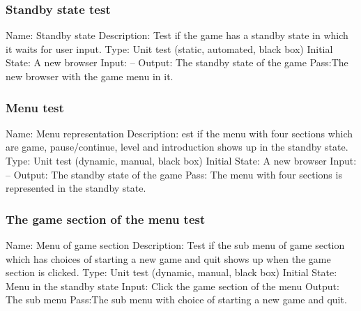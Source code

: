 \documentclass{article}
\begin{document}
\subsubsection{Standby state test}
Name:  Standby state\newline
Description: Test if the game has a standby state in which it waits for user input. \newline
Type: Unit test (static, automated, black box) \newline
Initial State: A new browser \newline
Input: -- \newline
Output: The standby state of the game \newline
Pass:The new browser with the game menu in it. \newline

\subsubsection{Menu test}
Name:  Menu representation\newline
Description: est if the menu with four sections which are game, pause/continue, level and introduction shows up in the standby state. \newline
Type: Unit test (dynamic, manual, black box) \newline
Initial State: A new browser \newline
Input: -- \newline
Output: The standby state of the game\newline
Pass: The menu with four sections is represented in the standby state. \newline

\subsubsection{The game section of the menu test}
Name: Menu of game section\newline
Description: Test if the sub menu of game section which has choices of starting a new game and quit shows up when the game section is clicked. \newline
Type: Unit test (dynamic, manual, black box) \newline
Initial State: Menu in the standby state \newline
Input: Click the game section of the menu \newline
Output: The sub menu \newline
Pass:The sub menu with choice of starting a new game and quit. \newline
\end{document}
